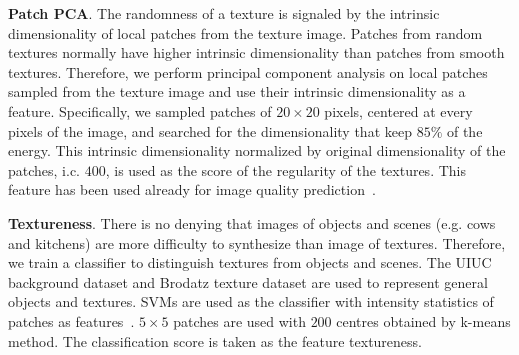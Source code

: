 


\textbf{Patch PCA}.  The randomness of a texture is signaled by the
intrinsic dimensionality of local patches from the texture image.
Patches from random textures normally have higher intrinsic
dimensionality than patches from smooth textures. Therefore, we
perform principal component analysis on local patches sampled from the
texture image and use their intrinsic dimensionality as a feature.
Specifically, we sampled patches of $20\times 20$ pixels, centered at
every pixels of the image, and searched for the dimensionality that
keep $85\%$ of the energy. This intrinsic dimensionality normalized by
original dimensionality of the patches, i.c. $400$, is used as the
score of the regularity of the textures. This feature has been used
already for image quality prediction~\cite{blind:quality:cvpr11}.

\textbf{Textureness}. There is no denying that images of objects and
scenes (e.g. cows and kitchens) are more difficulty to synthesize than
image of textures. Therefore, we train a classifier to distinguish
textures from objects and scenes. The UIUC background dataset and
Brodatz texture dataset are used to represent general objects and
textures. SVMs are used as the classifier with intensity statistics of
patches as features~\cite{material:pami:09}. $5 \times 5$ patches are
used with $200$ centres obtained by k-means method. The classification
score is taken as the feature textureness. 

